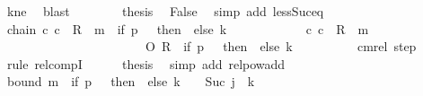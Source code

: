 \begin{isabellebody}
\ kne\ \isamarkupfalse%
\ blast\isanewline
\ \ \ \ \ \ \isamarkupfalse%
\ {\isacharquery}{\kern0pt}thesis\ \isamarkupfalse%
\ False\ \isamarkupfalse%
\ {\isacharparenleft}{\kern0pt}simp\ add{\isacharcolon}{\kern0pt}\ less{\isacharunderscore}{\kern0pt}Suc{\isacharunderscore}{\kern0pt}eq{\isacharparenright}{\kern0pt}\isanewline
\ \ \ \ \isamarkupfalse%
\isanewline
\ \ \isamarkupfalse%
\isanewline
\ \ \isamarkupfalse%
\ chain{\isacharcolon}{\kern0pt}\ {\isachardoublequoteopen}{\isacharparenleft}{\kern0pt}c{}{\isacharcomma}{\kern0pt}\ c{\isacharprime}{\kern0pt}{\isacharparenright}{\kern0pt}\ {\isasymin}\ R{\isacharprime}{\kern0pt}\ {\isacharcircum}{\kern0pt}{\isacharcircum}{\kern0pt}\ {\isacharparenleft}{\kern0pt}m\ {\isacharplus}{\kern0pt}\ {\isacharparenleft}{\kern0pt}if\ {\isacharquery}{\kern0pt}p\ {\isacharequal}{\kern0pt}\ {}\ then\ {}\ else\ {\isacharquery}{\kern0pt}k\ {\isacharplus}{\kern0pt}\ {}{\isacharparenright}{\kern0pt}{\isacharparenright}{\kern0pt}{\isachardoublequoteclose}\isanewline
\ \ \isamarkupfalse%
\ {\isacharminus}{\kern0pt}\isanewline
\ \ \ \ \isamarkupfalse%
\ {\isachardoublequoteopen}{\isacharparenleft}{\kern0pt}c{}{\isacharcomma}{\kern0pt}\ c{\isacharprime}{\kern0pt}{\isacharparenright}{\kern0pt}\ {\isasymin}\ R{\isacharprime}{\kern0pt}\ {\isacharcircum}{\kern0pt}{\isacharcircum}{\kern0pt}\ m\isanewline
\ \ \ \ \ \ \ \ \ \ \ \ \ \ \ \ \ \ \ \ \ \ \ O\ R{\isacharprime}{\kern0pt}\ {\isacharcircum}{\kern0pt}{\isacharcircum}{\kern0pt}\ {\isacharparenleft}{\kern0pt}if\ {\isacharquery}{\kern0pt}p\ {\isacharequal}{\kern0pt}\ {}\ then\ {}\ else\ {\isacharquery}{\kern0pt}k\ {\isacharplus}{\kern0pt}\ {}{\isacharparenright}{\kern0pt}{\isachardoublequoteclose}\isanewline
\ \ \ \ \ \ \isamarkupfalse%
\ cm{\isacharunderscore}{\kern0pt}rel\ step\ \isamarkupfalse%
\ {\isacharparenleft}{\kern0pt}rule\ relcompI{\isacharparenright}{\kern0pt}\isanewline
\ \ \ \ \isamarkupfalse%
\ {\isacharquery}{\kern0pt}thesis\ \isamarkupfalse%
\ {\isacharparenleft}{\kern0pt}simp\ add{\isacharcolon}{\kern0pt}\ relpow{\isacharunderscore}{\kern0pt}add{\isacharparenright}{\kern0pt}\isanewline
\ \ \isamarkupfalse%
\isanewline
\ \ \isamarkupfalse%
\ bound{\isacharcolon}{\kern0pt}\ {\isachardoublequoteopen}m\ {\isacharplus}{\kern0pt}\ {\isacharparenleft}{\kern0pt}if\ {\isacharquery}{\kern0pt}p\ {\isacharequal}{\kern0pt}\ {}\ then\ {}\ else\ {\isacharquery}{\kern0pt}k\ {\isacharplus}{\kern0pt}\ {}{\isacharparenright}{\kern0pt}\ {\isasymle}\ Suc\ j\ {\isacharasterisk}{\kern0pt}\ {\isacharparenleft}{\kern0pt}{\isacharquery}{\kern0pt}k\ {\isacharplus}{\kern0pt}\ {}{\isacharparenright}{\kern0pt}{\isachardoublequoteclose}\isanewline

\end{isabellebody}
